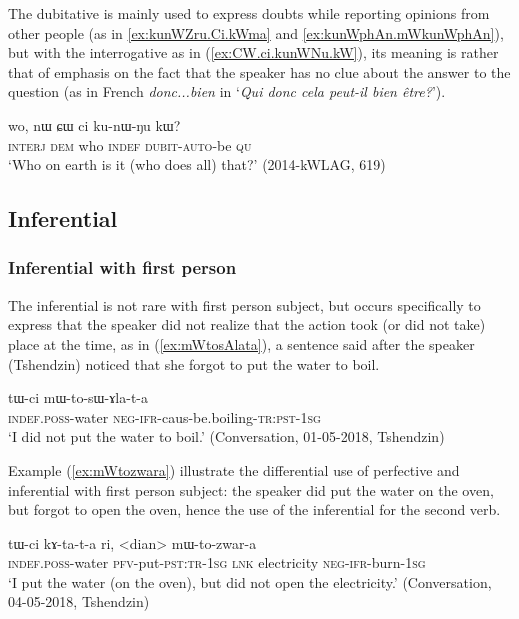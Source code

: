 The dubitative is mainly used to express doubts while reporting opinions from other people (as in \ref{ex:kunWZru.Ci.kWma} and \ref{ex:kunWphAn.mWkunWphAn}), but with the interrogative  as in (\ref{ex:CW.ci.kunWNu.kW}), its meaning is rather that of emphasis on the fact that the speaker has no clue about the answer to the question (as in French \textit{donc...bien} in `\textit{Qui donc cela peut-il bien être?}').

  \begin{exe}
\ex \label{ex:CW.ci.kunWNu.kW}
 \gll wo, nɯ ɕɯ ci ku-nɯ-ŋu kɯ?  \\
 \textsc{interj} \textsc{dem} who \textsc{indef} \textsc{dubit}-\textsc{auto}-be \textsc{qu} \\
\glt `Who on earth is it (who does all) that?' (2014-kWLAG, 619)
 \end{exe}
 
\subsection{Inferential} 

\subsubsection{Inferential with first person}
The inferential is not rare with first person subject, but occurs specifically to express that the speaker did not realize that the action took (or did not take) place at the time, as in (\ref{ex:mWtosAlata}), a sentence said after the speaker (Tshendzin) noticed that she forgot to put the water to boil.

\begin{exe}
\ex \label{ex:mWtosAlata}
\gll tɯ-ci mɯ-to-sɯ-ɤla-t-a \\
\textsc{indef}.\textsc{poss}-water \textsc{neg}-\textsc{ifr}-caus-be.boiling-\textsc{tr}:\textsc{pst}-\textsc{1sg} \\
\glt `I did not put the water to boil.' (Conversation, 01-05-2018, Tshendzin)
\end{exe}

Example (\ref{ex:mWtozwara}) illustrate the differential use of perfective and inferential with first person subject: the speaker did put the water on the oven, but forgot to open the oven, hence the use of the inferential for the second verb.

\begin{exe}
\ex \label{ex:mWtozwara}
\gll tɯ-ci kɤ-ta-t-a ri, <dian> mɯ-to-zwar-a \\
\textsc{indef}.\textsc{poss}-water \textsc{pfv}-put-\textsc{pst}:\textsc{tr}-\textsc{1sg} \textsc{lnk} electricity \textsc{neg}-\textsc{ifr}-burn-\textsc{1sg} \\
\glt `I put the water (on the oven), but did not open the electricity.' (Conversation, 04-05-2018, Tshendzin)
\end{exe}

